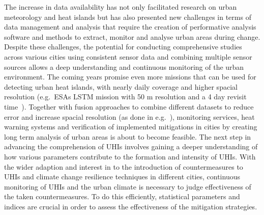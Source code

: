 \documentclass[12pt,a4paper, english,twoside]{article}
\begin{document}
  The increase in data availability has not only facilitated research on urban meteorology and heat islands but has also presented new challenges in terms of data management and analysis that require the creation of performative analysis software and methods to extract, monitor and analyse urban areas during change.
  Despite these challenges, the potential for conducting comprehensive studies across various cities using consistent sensor data and combining multiple sensor sources allows a deep understanding and continuous monitoring of the urban environment.
  The coming years promise even more missions that can be used for detecting urban heat islands, with nearly daily coverage and higher spacial resolution (e.g.~ESAs LSTM mission with 50 m resolution and a 4 day revisit time~\cite{CEOS2024}). 
  Together with fusion approaches to combine different datasets to reduce error and increase spacial resolution (as done in e.g.~\cite{CampsValls2009}), monitoring services, heat warning systems and verification of implemented mitigations in cities by creating long term analysis of urban areas is about to become feasible.
  The next step in advancing the comprehension of \glspl{UHI} involves gaining a deeper understanding of how various parameters contribute to the formation and intensity of \glspl{UHI}.
  With the wider adaption and interest in to the introduction of countermeasures to \glspl{UHI} and climate change resilience techniques in different cities, continuous monitoring of \glspl{UHI} and the urban climate is necessary to judge effectiveness of the taken countermeasures.
  To do this efficiently, statistical parameters and indices are crucial in order to assess the effectiveness of the mitigation strategies. 
\end{document}
